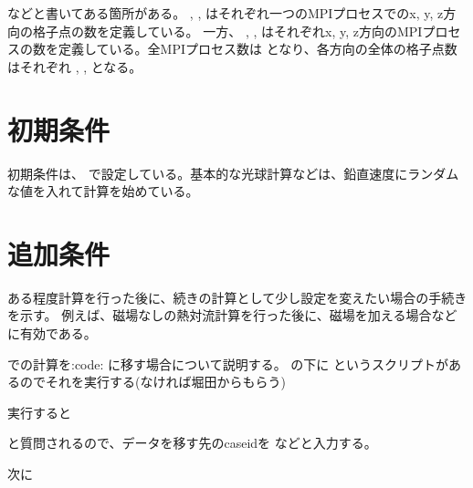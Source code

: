 \documentclass[letterpaper,10pt,dvipdfmx,report]{sphinxmanual}
\begin{document}
などと書いてある箇所がある。 ,  ,  はそれぞれ一つのMPIプロセスでのx, y, z方向の格子点の数を定義している。
一方、  ,  ,  はそれぞれx, y, z方向のMPIプロセスの数を定義している。全MPIプロセス数は  となり、各方向の全体の格子点数はそれぞれ  ,  ,  となる。


\section{初期条件}
\label{\detokenize{start:id10}}
初期条件は、  で設定している。基本的な光球計算などは、鉛直速度にランダムな値を入れて計算を始めている。


\section{追加条件}
\label{\detokenize{start:id11}}
ある程度計算を行った後に、続きの計算として少し設定を変えたい場合の手続きを示す。
例えば、磁場なしの熱対流計算を行った後に、磁場を加える場合などに有効である。

 での計算を:code: に移す場合について説明する。
 の下に  というスクリプトがあるのでそれを実行する(なければ堀田からもらう)

\begin{sphinxVerbatim}[commandchars=\\\{\}]
 
\end{sphinxVerbatim}

実行すると

\begin{sphinxVerbatim}[commandchars=\\\{\}]
       
\end{sphinxVerbatim}

と質問されるので、データを移す先のcaseidを  などと入力する。

次に
\end{document}
